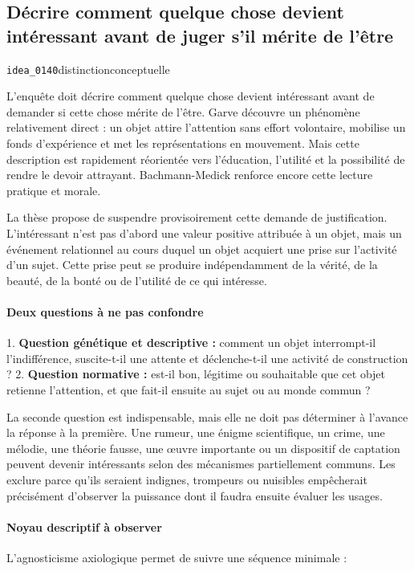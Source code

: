 \documentclass[10pt,a4paper]{article}
\begin{document}
\subsection{Décrire comment quelque chose devient intéressant avant de juger s'il mérite de l'être}
{\small\color{metadata} \texttt{idea\_0140}\quad\textbullet\quad distinction\quad\textbullet\quad conceptuelle\par}

L'enquête doit décrire comment quelque chose devient intéressant avant de demander si cette chose mérite de l'être. Garve découvre un phénomène relativement direct : un objet attire l'attention sans effort volontaire, mobilise un fonds d'expérience et met les représentations en mouvement. Mais cette description est rapidement réorientée vers l'éducation, l'utilité et la possibilité de rendre le devoir attrayant. Bachmann-Medick renforce encore cette lecture pratique et morale.

La thèse propose de suspendre provisoirement cette demande de justification. L'intéressant n'est pas d'abord une valeur positive attribuée à un objet, mais un événement relationnel au cours duquel un objet acquiert une prise sur l'activité d'un sujet. Cette prise peut se produire indépendamment de la vérité, de la beauté, de la bonté ou de l'utilité de ce qui intéresse.

\paragraph{Deux questions à ne pas confondre}
1. \textbf{Question génétique et descriptive :} comment un objet interrompt-il    l'indifférence, suscite-t-il une attente et déclenche-t-il une activité de    construction ? 2. \textbf{Question normative :} est-il bon, légitime ou souhaitable que cet objet    retienne l'attention, et que fait-il ensuite au sujet ou au monde commun ?

La seconde question est indispensable, mais elle ne doit pas déterminer à l'avance la réponse à la première. Une rumeur, une énigme scientifique, un crime, une mélodie, une théorie fausse, une œuvre importante ou un dispositif de captation peuvent devenir intéressants selon des mécanismes partiellement communs. Les exclure parce qu'ils seraient indignes, trompeurs ou nuisibles empêcherait précisément d'observer la puissance dont il faudra ensuite évaluer les usages.

\paragraph{Noyau descriptif à observer}
L'agnosticisme axiologique permet de suivre une séquence minimale :
\end{document}
